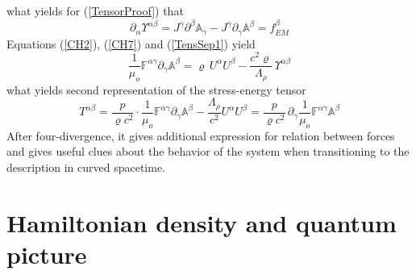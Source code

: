 \documentclass[aps,prx,preprint,groupedaddress,showkeys]{revtex4-2}
\begin{document}
what yields for (\ref{TensorProof}) that
\begin{equation} \label{UpsFin}
\partial_{\alpha} \Upsilon^{\alpha \beta} = J^{\gamma} \partial^{\beta} \mathbb{A}_{\gamma} - J^{\gamma}\partial_{\gamma} \mathbb{A}^{\beta} = f_{EM}^{\beta}
\end{equation}
Equations (\ref{CH2}), (\ref{CH7}) and (\ref{TensSep1}) yield
\begin{equation} \label{TensSep2}
\frac{1}{\mu_o} \mathbb{F}^{\alpha \gamma} \partial_{\gamma} \mathbb{A}^{\beta} = \varrho \, U^{\alpha} U^{\beta} - \frac{c^2 \varrho }{\Lambda_{\rho}} \, \Upsilon^{\alpha \beta}
\end{equation}
what yields second representation of the stress-energy tensor
\begin{equation} \label{TensSep3}
T^{\alpha \beta} = \frac{p}{\varrho c^2} \cdot \frac{1}{\mu_o} \mathbb{F}^{\alpha \gamma} \partial_{\gamma} \mathbb{A}^{\beta} - \frac {\Lambda_{\rho}}{c^2} U^{\alpha} U^{\beta} = \frac{p}{\varrho c^2} \, \partial_{\gamma} \frac{1}{\mu_o} \mathbb{F}^{\alpha \gamma} \mathbb{A}^{\beta}
\end{equation}
After four-divergence, it gives additional expression for relation between forces and gives useful clues about the behavior of the system when transitioning to the description in curved spacetime.

\section{Hamiltonian density and quantum picture} \label{Quantas}
\end{document}
